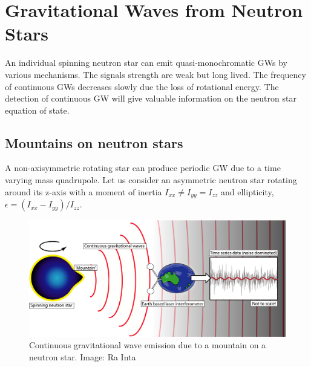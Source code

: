 \documentclass{ttuthes2007}
\begin{document}
\section{Gravitational Waves from Neutron Stars}
An individual spinning neutron star can emit quasi-monochromatic \acp{GW} by
various mechanisms. The signals strength are weak but long lived. The frequency
of continuous \acp{GW} decreases slowly due the loss of rotational energy. The
detection of continuous \ac{GW} will give valuable information on the neutron star
equation of state.

\subsection{Mountains on neutron stars}
A non-axisymmetric rotating star can produce periodic \ac{GW} due to a time
varying mass quadrupole. Let us consider an asymmetric neutron star rotating
around its z-axis with a moment of inertia $I_{xx}\neq I_{yy}=I_{zz}$ and
ellipticity, $\epsilon=(I_{xx}-I_{yy})/I_{zz}$.

\begin{figure}[h!]                                                            
        \includegraphics[width=\textwidth]{figure/CW.png}                 
        \caption{Continuous gravitational wave emission due to a mountain on a
neutron star. Image: Ra Inta}
        \label{fig:CW}                                                 
\end{figure}     
\end{document}

